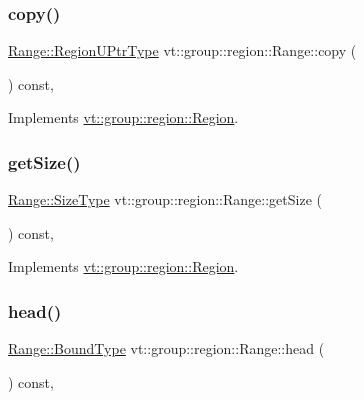 \subsubsection{\texorpdfstring{copy()}{copy()}}
{\footnotesize\ttfamily \hyperlink{structvt_1_1group_1_1region_1_1_region_ae5f42cf159116a3cf8bd65423eb01037}{Range\+::\+Region\+U\+Ptr\+Type} vt\+::group\+::region\+::\+Range\+::copy (\begin{DoxyParamCaption}{ }\end{DoxyParamCaption}) const\hspace{0.3cm}{\ttfamily [override]}, {\ttfamily [virtual]}}



Implements \hyperlink{structvt_1_1group_1_1region_1_1_region_a040d20a4f8c6fa351d7fe1cbfcae3a03}{vt\+::group\+::region\+::\+Region}.

\mbox{\label{structvt_1_1group_1_1region_1_1_range_a111a632a4bba6b6940a3d036bd4cba76}} 
\subsubsection{\texorpdfstring{get\+Size()}{getSize()}}
{\footnotesize\ttfamily \hyperlink{structvt_1_1group_1_1region_1_1_region_a9bb381adf31111aae34dbc644bad6c1f}{Range\+::\+Size\+Type} vt\+::group\+::region\+::\+Range\+::get\+Size (\begin{DoxyParamCaption}{ }\end{DoxyParamCaption}) const\hspace{0.3cm}{\ttfamily [override]}, {\ttfamily [virtual]}}



Implements \hyperlink{structvt_1_1group_1_1region_1_1_region_ab0db5f78c57943b4b9973ba2c7c619f7}{vt\+::group\+::region\+::\+Region}.

\mbox{\label{structvt_1_1group_1_1region_1_1_range_ab6abce20eb32475d0ae734770b6586c0}} 
\subsubsection{\texorpdfstring{head()}{head()}}
{\footnotesize\ttfamily \hyperlink{structvt_1_1group_1_1region_1_1_region_abf426ff85bed72c1c6524fad6a9f1751}{Range\+::\+Bound\+Type} vt\+::group\+::region\+::\+Range\+::head (\begin{DoxyParamCaption}{ }\end{DoxyParamCaption}) const\hspace{0.3cm}{\ttfamily [override]}, {\ttfamily [virtual]}}



